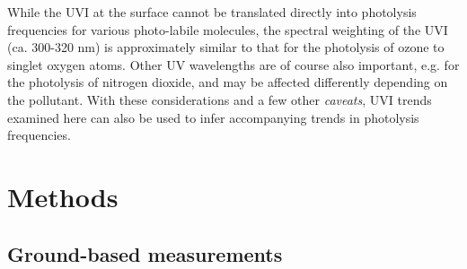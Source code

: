 \documentclass[10pt]{article}
\begin{document}
While the UVI at the surface cannot be translated directly into
photolysis frequencies for various photo-labile molecules, the spectral
weighting of the UVI (ca. 300-320 nm) is approximately similar to that
for the photolysis of ozone to singlet oxygen atoms. Other UV
wavelengths are of course also important, e.g. for the photolysis of
nitrogen dioxide, and may be affected differently depending on the
pollutant. With these considerations and a few other \emph{caveats}, UVI
trends examined here can also be used to infer accompanying trends in
photolysis frequencies.

\section*{Methods}

 {\label{770133}}

\subsection*{Ground-based measurements}

{\label{220276}}
\end{document}

